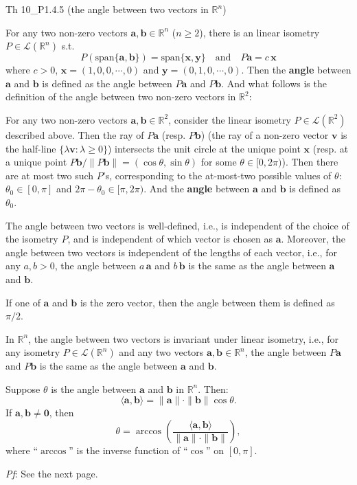 \documentclass{article}
\begin{document}
\begin{Th}{Th 10\_P1.4.5 (the angle between two vectors in $\mathbb{R}^n$)}
    \begin{compactenum}
        \item For any two non-zero vectors $\pmb{a}, \pmb{b}\in \mathbb{R}^n$ ($n\geq 2$), there is an linear isometry $P\in\mathcal{L}(\mathbb{R}^n)$ s.t.
        $$ P(\text{span}\{\pmb{a}, \pmb{b}\}) = \text{span}\{\pmb{x}, \pmb{y}\} \quad \text{and} \quad P\pmb{a} = c\,\pmb{x} $$
        where $c>0$, $\pmb{x} = (1, 0, 0, \cdots, 0)$ and $\pmb{y} = (0, 1, 0, \cdots, 0)$. 
        \textcolor{Df}{Then the \textbf{angle} between $\pmb{a}$ and $\pmb{b}$ is defined as the angle between $P\pmb{a}$ and $P\pmb{b}$. And what follows is the definition of the angle between two non-zero vectors in $\mathbb{R}^2$:}
        \item For any two non-zero vectors $\pmb{a}, \pmb{b}\in \mathbb{R}^2$, consider the linear isometry $P\in\mathcal{L}(\mathbb{R}^2)$ described above. Then the ray of $P\pmb{a}$ (resp. $P\pmb{b}$) (the ray of a non-zero vector $\pmb{v}$ is the half-line $\{\lambda \pmb{v}: \lambda\geq 0\}$) intersects the unit circle at the unique point $\pmb{x}$ (resp. at a unique point $P\pmb{b} / \|P\pmb{b}\| = (\cos\theta, \sin\theta)$ for some $\theta\in [0,2\pi)$). Then there are at most two such $P$'s, corresponding to the at-most-two possible values of $\theta$: $\theta_0\in [0, \pi]$ and $2\pi - \theta_0\in [\pi, 2\pi)$. \textcolor{Df}{And the \textbf{angle} between $\pmb{a}$ and $\pmb{b}$ is defined as $\theta_0$.}
        \item The angle between two vectors is well-defined, i.e., is independent of the choice of the isometry $P$, and is independent of which vector is chosen as $\pmb{a}$. Moreover, the angle between two vectors is independent of the lengths of each vector, i.e., for any $a, b>0$, the angle between $a\,\pmb{a}$ and $b\,\pmb{b}$ is the same as the angle between $\pmb{a}$ and $\pmb{b}$.
        \item \textcolor{Df}{If one of $\pmb{a}$ and $\pmb{b}$ is the zero vector, then the angle between them is defined as $\pi/2$.}
        \item In $\mathbb{R}^n$, the angle between two vectors is invariant under linear isometry, i.e., for any isometry $P\in\mathcal{L}(\mathbb{R}^n)$ and any two vectors $\pmb{a}, \pmb{b}\in \mathbb{R}^n$, the angle between $P\pmb{a}$ and $P\pmb{b}$ is the same as the angle between $\pmb{a}$ and $\pmb{b}$.
        \item Suppose $\theta$ is the angle between $\pmb{a}$ and $\pmb{b}$ in $\mathbb{R}^n$. Then:
        $$ \langle \pmb{a}, \pmb{b} \rangle = \|\pmb{a}\| \cdot \|\pmb{b}\|\cos \theta. $$
        If $\pmb{a}, \pmb{b}\neq \pmb{0}$, then
        $$ \theta = \arccos \left(\frac{\langle \pmb{a}, \pmb{b} \rangle}{\|\pmb{a}\| \cdot \|\pmb{b}\|}\right), $$
        \textcolor{Df}{where ``$\arccos$'' is the inverse function of ``$\cos$'' on $[0, \pi]$.}
    \end{compactenum}
    \tcblower
    \textit{Pf}: See the next page.
\end{Th}
\end{document}
